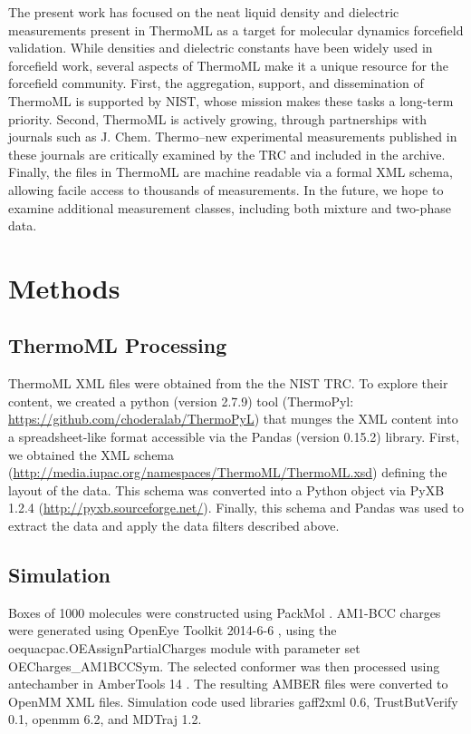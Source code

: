 \documentclass[journal=jacsat,manuscript=article]{achemso}
\begin{document}
The present work has focused on the neat liquid density and dielectric measurements present in ThermoML \cite{frenkel2006xml, frenkel2003thermoml, chirico2003thermoml} as a target for molecular dynamics forcefield validation.  While densities and dielectric constants have been widely used in forcefield work, several aspects of ThermoML make it a unique resource for the forcefield community.  First, the aggregation, support, and dissemination of ThermoML is supported by NIST, whose mission makes these tasks a long-term priority.  Second, ThermoML is actively growing, through partnerships with journals such as J. Chem. Thermo--new experimental measurements published in these journals are critically examined by the TRC and included in the archive.  Finally, the files in ThermoML are machine readable via a formal XML schema, allowing facile access to thousands of measurements.  In the future, we hope to examine additional measurement classes, including both mixture and two-phase data.


\section{Methods}

\subsection{ThermoML Processing}

ThermoML XML files were obtained from the the NIST TRC.  To explore their content, we created a python (version 2.7.9) tool (ThermoPyl: \url{https://github.com/choderalab/ThermoPyL}) that munges the XML content into a spreadsheet-like format accessible via the  Pandas (version 0.15.2) library.  First, we obtained the XML schema (\url{http://media.iupac.org/namespaces/ThermoML/ThermoML.xsd}) defining the layout of the data.  This schema was converted into a Python object via PyXB 1.2.4 (\url{http://pyxb.sourceforge.net/}).  Finally, this schema and Pandas was used to extract the data and apply the data filters described above.  

\subsection{Simulation}
Boxes of 1000 molecules were constructed using PackMol \cite{martinez2009packmol}.  AM1-BCC charges were generated using OpenEye Toolkit 2014-6-6 \cite{openeye}, using the oequacpac.OEAssignPartialCharges module with parameter set OECharges\_AM1BCCSym.  The selected conformer was then processed using antechamber in AmberTools 14 \cite{amber14}.  The resulting AMBER files were converted to OpenMM \cite{eastman2012openmm} XML files.  Simulation code used libraries gaff2xml 0.6, TrustButVerify 0.1, openmm 6.2, and MDTraj \cite{mcgibbon2014mdtraj} 1.2.  
\end{document}
